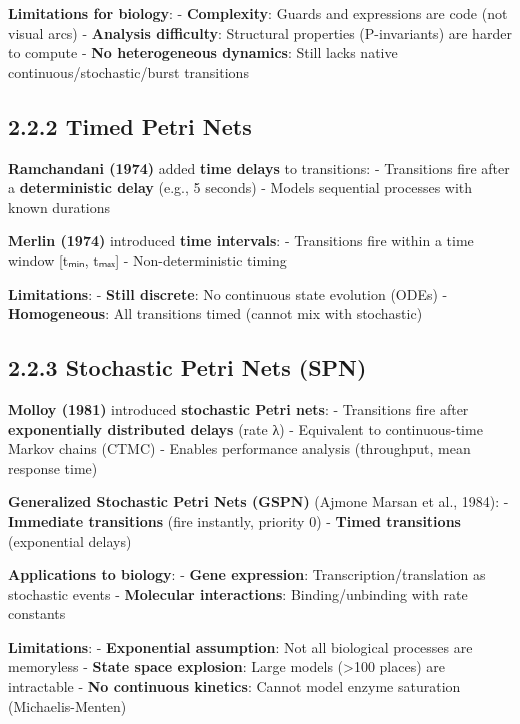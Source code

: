\textbf{Limitations for biology}: - \textbf{Complexity}: Guards and
expressions are code (not visual arcs) - \textbf{Analysis difficulty}:
Structural properties (P-invariants) are harder to compute - \textbf{No
heterogeneous dynamics}: Still lacks native continuous/stochastic/burst
transitions

\hypertarget{timed-petri-nets}{%
\subsection{2.2.2 Timed Petri Nets}\label{timed-petri-nets}}

\textbf{Ramchandani (1974)} added \textbf{time delays} to transitions: -
Transitions fire after a \textbf{deterministic delay} (e.g., 5 seconds)
- Models sequential processes with known durations

\textbf{Merlin (1974)} introduced \textbf{time intervals}: - Transitions
fire within a time window {[}tₘᵢₙ, tₘₐₓ{]} - Non-deterministic timing

\textbf{Limitations}: - \textbf{Still discrete}: No continuous state
evolution (ODEs) - \textbf{Homogeneous}: All transitions timed (cannot
mix with stochastic)

\hypertarget{stochastic-petri-nets-spn}{%
\subsection{2.2.3 Stochastic Petri Nets
(SPN)}\label{stochastic-petri-nets-spn}}

\textbf{Molloy (1981)} introduced \textbf{stochastic Petri nets}: -
Transitions fire after \textbf{exponentially distributed delays} (rate
λ) - Equivalent to continuous-time Markov chains (CTMC) - Enables
performance analysis (throughput, mean response time)

\textbf{Generalized Stochastic Petri Nets (GSPN)} (Ajmone Marsan et al.,
1984): - \textbf{Immediate transitions} (fire instantly, priority 0) -
\textbf{Timed transitions} (exponential delays)

\textbf{Applications to biology}: - \textbf{Gene expression}:
Transcription/translation as stochastic events - \textbf{Molecular
interactions}: Binding/unbinding with rate constants

\textbf{Limitations}: - \textbf{Exponential assumption}: Not all
biological processes are memoryless - \textbf{State space explosion}:
Large models (\textgreater100 places) are intractable - \textbf{No
continuous kinetics}: Cannot model enzyme saturation (Michaelis-Menten)

